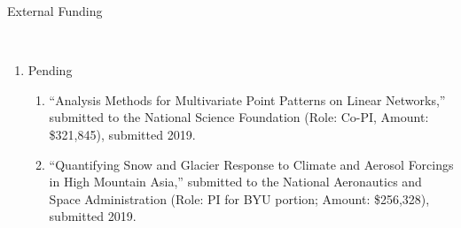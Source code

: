 \documentclass[12pt]{article}
\newcommand{\head}[1]{ %
    \bigskip %
    \begin{large}\begin{bf}{#1}\end{bf}\end{large} %

    \ \\ [-1.3cm] %

    \hrulefill}
\begin{document}
\head{External Funding}
\begin{enumerate}[label=$\bullet$]

\item Pending
\begin{enumerate}[label=$\cdot$]
\item ``Analysis Methods for Multivariate Point Patterns on Linear Networks,'' submitted to the National Science Foundation (Role: Co-PI, Amount: \$321,845), submitted 2019.
\item ``Quantifying Snow and Glacier Response to Climate and Aerosol Forcings in High Mountain Asia,'' submitted to the National Aeronautics and Space Administration (Role: PI for BYU portion; Amount: \$256,328), submitted 2019.
\end{enumerate}
\end{enumerate}
\end{document}
